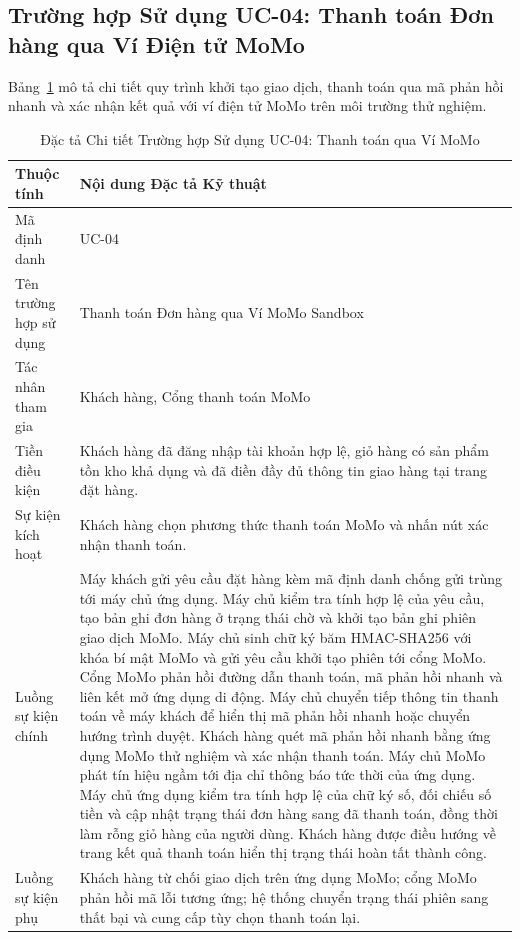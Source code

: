 \subsection{Trường hợp Sử dụng UC-04: Thanh toán Đơn hàng qua Ví Điện tử MoMo}
Bảng~\ref{tab:uc04} mô tả chi tiết quy trình khởi tạo giao dịch, thanh toán qua mã phản hồi nhanh và xác nhận kết quả với ví điện tử MoMo trên môi trường thử nghiệm.

\begin{table}[H]
\centering
\caption{Đặc tả Chi tiết Trường hợp Sử dụng UC-04: Thanh toán qua Ví MoMo}
\label{tab:uc04}
\begin{tabularx}{\textwidth}{p{3.5cm}X}
\toprule
\textbf{Thuộc tính} & \textbf{Nội dung Đặc tả Kỹ thuật} \\
\midrule
Mã định danh & UC-04 \\
Tên trường hợp sử dụng & Thanh toán Đơn hàng qua Ví MoMo Sandbox \\
Tác nhân tham gia & Khách hàng, Cổng thanh toán MoMo \\
Tiền điều kiện & Khách hàng đã đăng nhập tài khoản hợp lệ, giỏ hàng có sản phẩm tồn kho khả dụng và đã điền đầy đủ thông tin giao hàng tại trang đặt hàng. \\
Sự kiện kích hoạt & Khách hàng chọn phương thức thanh toán MoMo và nhấn nút xác nhận thanh toán. \\
Luồng sự kiện chính & 
Máy khách gửi yêu cầu đặt hàng kèm mã định danh chống gửi trùng tới máy chủ ứng dụng.
Máy chủ kiểm tra tính hợp lệ của yêu cầu, tạo bản ghi đơn hàng ở trạng thái chờ và khởi tạo bản ghi phiên giao dịch MoMo.
Máy chủ sinh chữ ký băm HMAC-SHA256 với khóa bí mật MoMo và gửi yêu cầu khởi tạo phiên tới cổng MoMo.
Cổng MoMo phản hồi đường dẫn thanh toán, mã phản hồi nhanh và liên kết mở ứng dụng di động.
Máy chủ chuyển tiếp thông tin thanh toán về máy khách để hiển thị mã phản hồi nhanh hoặc chuyển hướng trình duyệt.
Khách hàng quét mã phản hồi nhanh bằng ứng dụng MoMo thử nghiệm và xác nhận thanh toán.
Máy chủ MoMo phát tín hiệu ngầm tới địa chỉ thông báo tức thời của ứng dụng.
Máy chủ ứng dụng kiểm tra tính hợp lệ của chữ ký số, đối chiếu số tiền và cập nhật trạng thái đơn hàng sang đã thanh toán, đồng thời làm rỗng giỏ hàng của người dùng.
Khách hàng được điều hướng về trang kết quả thanh toán hiển thị trạng thái hoàn tất thành công. \\
Luồng sự kiện phụ & Khách hàng từ chối giao dịch trên ứng dụng MoMo; cổng MoMo phản hồi mã lỗi tương ứng; hệ thống chuyển trạng thái phiên sang thất bại và cung cấp tùy chọn thanh toán lại. \\

\end{tabularx}
\end{table}
